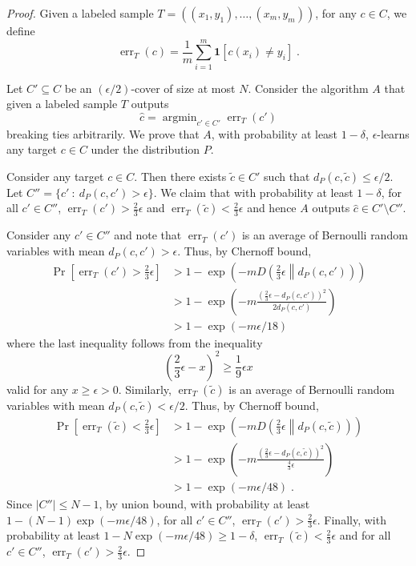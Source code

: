 \documentclass[11pt]{article}
\newcommand{\indicator}[1]{\mathbf{1}\left[{#1}\right]}
\newcommand{\KL}[2]{D\left(#1 \middle\| #2 \right)}
\DeclareMathOperator*{\argmin}{argmin}
\DeclareMathOperator{\err}{err}
\begin{document}
\begin{proof}
Given a labeled sample $T = ( (x_1, y_1), \dots, (x_m, y_m) )$, for any $c \in C$,
we define
$$
\err_T(c) = \frac{1}{m} \sum_{i=1}^m \indicator{c(x_i) \neq y_i} \; .
$$

Let $C' \subseteq C$ be an $(\epsilon/2)$-cover of size at most $N$.
Consider the algorithm $A$ that given a labeled sample $T$ outputs
$$
\widehat c = \argmin_{c' \in C'} \err_T(c')
$$
breaking ties arbitrarily. We prove that $A$, with probability at least
$1-\delta$, $\epsilon$-learns any target $c \in C$ under the distribution $P$.

Consider any target $c \in C$. Then there exists $\widetilde c \in C'$ such that
$d_P(c,\widetilde c) \le \epsilon/2$. Let $C'' = \{ c' ~:~ d_P(c,c') > \epsilon \}$.
We claim that with probability at least $1 - \delta$, for all $c' \in C''$,
$\err_T(c') > \frac{2}{3} \epsilon$ and $\err_T(\widetilde{c}) <
\frac{2}{3}\epsilon$ and hence $A$ outputs $\widehat c \in C' \setminus C''$.

Consider any $c' \in C''$ and note that $\err_T(c')$ is an average of Bernoulli
random variables with mean $d_P(c,c') > \epsilon$. Thus, by Chernoff bound,
\begin{align*}
\Pr \left[ \err_T(c') > \frac{2}{3} \epsilon \right]
& > 1 - \exp \left( - m \KL{\frac{2}{3} \epsilon}{d_P(c,c')} \right) \\
& > 1 - \exp \left( - m \frac{(\frac{2}{3} \epsilon - d_P(c,c'))^2}{2 d_P(c,c')} \right) \\
& > 1 - \exp \left( - m \epsilon/18 \right)
\end{align*}
where the last inequality follows from the inequality
$$
\left( \frac{2}{3} \epsilon - x \right)^2 \ge \frac{1}{9} \epsilon x
$$
valid for any $x \ge \epsilon > 0$.
Similarly, $\err_T(\widetilde{c})$ is an average of Bernoulli random variables with mean $d_P(c, \widetilde{c}) < \epsilon/2$.
Thus, by Chernoff bound,
\begin{align*}
\Pr \left[ \err_T(\widetilde{c}) < \frac{2}{3} \epsilon \right]
& > 1 - \exp \left( - m \KL{\frac{2}{3} \epsilon}{d_P(c, \widetilde{c})} \right) \\
& > 1 - \exp \left( - m \frac{(\frac{2}{3} \epsilon - d_P(c, \widetilde{c}))^2}{\frac{4}{3} \epsilon} \right) \\
& > 1 - \exp \left( - m \epsilon / 48 \right) \; .
\end{align*}
Since $|C''| \le N - 1$, by union bound, with probability at least $1 - (N - 1)
\exp(-m \epsilon/48)$, for all $c' \in C''$, $\err_T(c') > \frac{2}{3}
\epsilon$. Finally, with probability at least $1 - N \exp(-m \epsilon/48) \ge 1 -
\delta$, $\err_T(\widetilde{c}) < \frac{2}{3}\epsilon$ and for all $c' \in C''$,
$\err_T(c') > \frac{2}{3} \epsilon$.
\end{proof}
\end{document}
